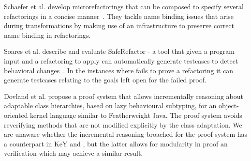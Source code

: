 Schaefer et al. develop microrefactorings that can be composed to specify several refactorings in a concise manner~\cite{Schafer-OOPSLA-2010}.
They tackle name binding issues that arise during transformations by making use of an infrastructure to preserve correct name binding in refactorings.

Soares et al. describe and evaluate SafeRefactor - a tool that given a program input and a refactoring to apply can automatically generate testcases to detect behavioral changes~\cite{Soares-IEEE-2010}.
In the instances where \Refinity{} fails to prove a refactoring it can generate testcases relating to the goals left open for the failed proof.


Dovland et al. \cite{dovland:adaptableclass2015} propose a proof system that allows
incrementally reasoning about adaptable class hierarchies, based on
lazy behavioural subtyping, for 
an object-oriented kernel language similar to Featherweight Java. The
proof system avoids reverifying methods that are not modified
explicitly by the class adaptation.
We are unaware whether the incremental reasoning broached for the proof system has a counterpart in KeY and \Refinity{}, but
the latter allows for modularity in proof an verification which may achieve a similar result.


